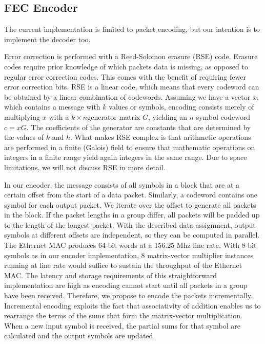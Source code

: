 \subsection{FEC Encoder}

The current implementation is limited to packet encoding, but our intention is
to implement the decoder too.

Error correction is performed with a Reed-Solomon erasure (RSE) code.  Erasure codes
require prior knowledge of which packets data is missing, as opposed to regular
error correction codes.  This comes with the benefit of requiring fewer error
correction bits.  RSE is a linear code, which means that every codeword can be
obtained by a linear combination of codewords.  Assuming we have a vector $x$,
which contains a message with $k$ values or symbols, encoding consists merely
of multiplying $x$ with a $k \times n$generator matrix $G$, yielding an $n$-symbol
codeword $c = xG$.  The coefficients of the
generator are constants that are determined by the values of $k$ and $h$.  What
makes RSE complex is that arithmetic operations are performed in a finite (Galois)
field to ensure that mathematic operations on integers in a finite range yield
again integers in the same range.  Due to space limitations, we will not discuss
RSE in more detail.

In our encoder, the message consists of all symbols in a block that are at a
certain offset from the start of a data packet.  Similarly, a codeword contains
one symbol for each output packet.  We iterate over the offset to generate
all packets in the block.  If the packet lengths in a group differ, all packets
will be padded up to the length of the longest packet.
With the described data assignment, output symbols at
different offsets are independent, so they can be computed in parallel.  The
Ethernet MAC produces 64-bit words at a 156.25 Mhz line rate.  With 8-bit symbols as in our
encoder implementation, 8 matrix-vector multiplier instances running at
line rate would suffice to sustain the throughput of the Ethernet MAC.  The
latency and storage requirements of this straightforward implementation are
high as encoding cannot start until all packets in a group have been received.
Therefore, we propose to encode the packets incrementally.  Incremental
encoding exploits the fact that associativity of addition enables us to
rearrange the terms of the sums that form the matrix-vector multiplication.
When a new input symbol is received, the partial sums for that symbol are
calculated and the output symbols are updated.

